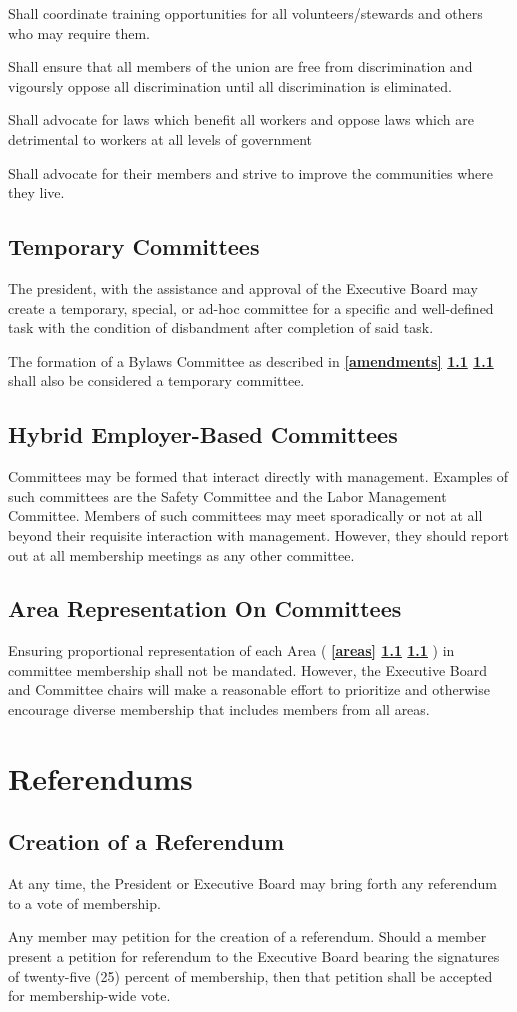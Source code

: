 \documentclass[11pt]{article}
\newcommand{\article}[1]{\vspace{.50cm}\section{#1}}
\newcommand{\articlesection}[1]{\vspace{.25cm}\subsection{#1}}
\newcommand{\fullref}[3]{%
  \textbf{%
    \ifthenelse{\isempty{#1}}%
    {}%
    {\ref{#1}}%
    \ifthenelse{\isempty{#2}}%
    {}%
    {%
      \ifthenelse{\isempty{#1}}{}{, }%
      \ref{#2}%
    }%
    \ifthenelse{\isempty{#3}}%
    {}%
    {\ref{#3}}%
  }%
}
\begin{document}
\begin{description}[labelwidth=\linewidth, listparindent=0pt]
\item[Education Committee]
Shall coordinate training opportunities for all volunteers/stewards and others who may require them.

\item[Human Rights Committee]
Shall ensure that all members of the union are free from discrimination and vigoursly oppose all discrimination until all discrimination is eliminated.

\item[Legislative/Political Action Committee]
Shall advocate for laws which benefit all workers and oppose laws which are detrimental to workers at all levels of government

\item[Community Action Committee]
Shall advocate for their members and strive to improve the communities where they live.
\end{description}

\articlesection{Temporary Committees}
The president, with the assistance and approval of the Executive Board may create a temporary, special, or ad-hoc committee for a specific and well-defined task with the condition of disbandment after completion of said task.

The formation of a Bylaws Committee as described in \fullref{amendments}{}{} shall also be considered a temporary committee.

\articlesection{Hybrid Employer-Based Committees}
Committees may be formed that interact directly with management. Examples of such committees are the Safety Committee and the Labor Management Committee. Members of such committees may meet sporadically or not at all beyond their requisite interaction with management. However, they should report out at all membership meetings as any other committee.

\articlesection{Area Representation On Committees}
Ensuring proportional representation of each Area (\fullref{areas}{}{}) in committee membership shall not be mandated. However, the Executive Board and Committee chairs will make a reasonable effort to prioritize and otherwise encourage diverse membership that includes members from all areas.


\article{Referendums}\label{referendums}
\articlesection{Creation of a Referendum}
\begin{paralist}
  \item At any time, the President or Executive Board may bring forth any referendum to a vote of membership.

  \item Any member may petition for the creation of a referendum. Should a member present a petition for referendum to the Executive Board bearing the signatures of twenty-five (25) percent of membership, then that petition shall be accepted for membership-wide vote.
\end{paralist}
\end{document}
